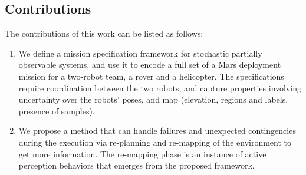 \documentclass[conference]{IEEEtran}
\begin{document}
	\subsection{Contributions}
	The contributions of this work can be listed as follows:
	\begin{enumerate}
	
	\item We define a mission specification framework for stochastic partially observable systems, and 
	use it to encode a full set of a Mars deployment mission for a two-robot team, a rover and a helicopter.
	The specifications require coordination between the two robots, and capture properties involving
	uncertainty over the robots' poses, and map (elevation, regions and labels, presence of samples).
	
	
	
	
	
	\item We propose a method that can handle failures and unexpected contingencies during the execution via re-planning and re-mapping of the environment to get more information. The re-mapping phase is an instance of active perception behaviors that emerges from the proposed framework.
	
	

\end{enumerate}
\end{document}
